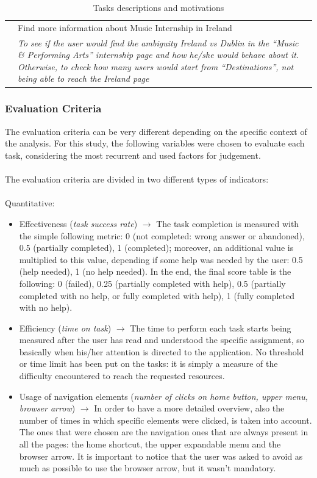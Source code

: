 \documentclass[11pt, letterpaper]{article}
\begin{document}
\begin{table}[H]
\begin{adjustbox}{width=1\textwidth}
\begin{tabularx}{1\textwidth} { 
        | c 
        | >{\centering\arraybackslash}X | }
        \hline 
        \label{Task:10}
        \multirow{2}{*}{Task 10} & Find more information about Music Internship in Ireland \\
        \cline{2-2}
        & \textit{To see if the user would find the ambiguity Ireland vs Dublin in the “Music \& Performing Arts” internship page and how he/she would behave about it. Otherwise, to check how many users would start from “Destinations”, not being able to reach the Ireland page} \\
        \hline 
    \end{tabularx}
    \end{adjustbox}
    \caption{Tasks descriptions and motivations}
\end{table}


\subsubsection{Evaluation Criteria}
The evaluation criteria can be very different depending on the specific context of the analysis. For this study, the following variables were chosen to evaluate each task, considering the most recurrent and used factors for judgement. \\
\\
The evaluation criteria are divided in two different types of indicators: \\
\\
Quantitative: 
\begin{itemize}
    \item Effectiveness (\textit{task success rate}) $\rightarrow$ The task completion is measured with the simple following metric: 0 (not completed: wrong answer or abandoned), 0.5 (partially completed), 1 (completed); moreover, an additional value is multiplied to this value, depending if some help was needed by the user: 0.5 (help needed), 1 (no help needed). In the end, the final score table is the following: 0 (failed), 0.25 (partially completed with help), 0.5 (partially completed with no help, or fully completed with help), 1 (fully completed with no help). 
    \item Efficiency (\textit{time on task}) $\rightarrow$ The time to perform each task starts being measured after the user has read and understood the specific assignment, so basically when his/her attention is directed to the application. No threshold or time limit has been put on the tasks: it is simply a measure of the difficulty encountered to reach the requested resources. 
    \item Usage of navigation elements (\textit{number of clicks on home button, upper menu, browser arrow}) $\rightarrow$ In order to have a more detailed overview, also the number of times in which specific elements were clicked, is taken into account. The ones that were chosen are the navigation ones that are always present in all the pages: the home shortcut, the upper expandable menu and the browser arrow. It is important to notice that the user was asked to avoid as much as possible to use the browser arrow, but it wasn’t mandatory.
\end{itemize}
\end{document}
